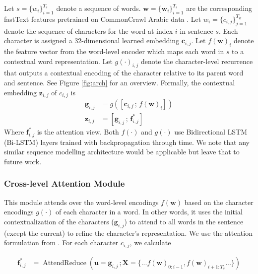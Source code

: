 \documentclass[11pt]{article}
\begin{document}
Let $s = \{w_i\}_{i=1}^{T_s}$ denote a sequence of words. $\mathbf{w}=\{\mathbf{w}_i\}_{i=1}^{T_s}$ are the corresponding fastText features pretrained on CommonCrawl Arabic data \cite{fastText17}. Let $w_i = \{c_{i,j}\}_{j=1}^{T_w}$ denote the sequence of characters for the word at index $i$ in sentence $s$. Each character is assigned a 32-dimensional learned embedding $\mathbf{c}_{i,j}$. Let $f(\mathbf{w})_i$ denote the feature vector from the word-level encoder which maps each word in $s$ to a contextual word representation. Let $g(\cdot)_{i,j}$ denote the character-level recurrence that
outputs a contextual encoding of the character relative to its parent word and sentence. See Figure \ref{fig:arch} for an overview. Formally, the contextual embedding $\mathbf{z}_{i,j}$ of $c_{i,j}$ is
\begin{align}
    \mathbf{g}_{i,j} &=
    g\left(
        \left[
            \mathbf{c}_{i,j} \, ; \,f(\mathbf{w})_i
        \right]
    \right)
    \\
    \mathbf{z}_{i,j}
        &=\left[
            \mathbf{g}_{i,j}
            \,;\,
            \mathbf{f}^*_{i,j}
        \right]
\end{align}
Where $\mathbf{f}^*_{i,j}$ is the attention view. Both $f(\cdot)$ and $g(\cdot)$ use Bidirectional LSTM (Bi-LSTM) layers \cite{graves05} trained with backpropagation through time. We note that any similar sequence modelling architecture would be applicable \cite{gru14,attention} but leave that to future work.

\subsubsection{Cross-level Attention Module}
\label{arch:attn}
This module attends over the word-level encodings $f(\mathbf{w})$ based on the character encodings $g(\cdot)$ of each character in a word. In other words, it uses the initial contextualization of the characters ($\mathbf{g}_{i,j}$) to attend to all words in the sentence (except the current) to refine the character's representation. We use the attention formulation from \cite{attention}. For each character $c_{i,j}$, we calculate 

\begin{align}
    \mathbf{f}^*_{i,j}
    &= \operatorname{AttendReduce}\left(
        \mathbf{u} = \mathbf{g}_{i,j}
        \,;
        \mathbf{X} =
        \{... f(\mathbf{w})_{0 : i-1} , f(\mathbf{w})_{i+1 : T_s} ...\}
    \right)
\end{align}
\end{document}

